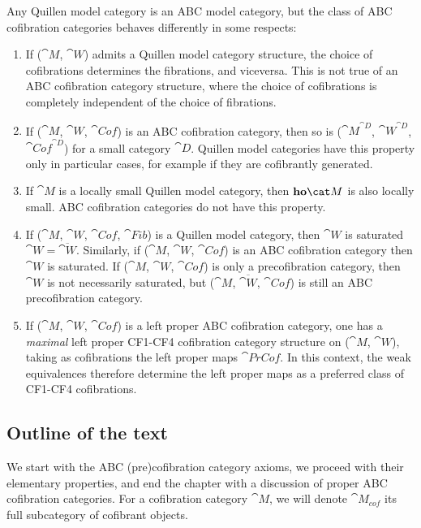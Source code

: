 Any Quillen model category is an ABC model category, but the class of ABC cofibration categories behaves differently in some respects:
\begin{enumerate}
\item
If (${\cat M}$, ${\cat W}$) admits a Quillen model category structure, the choice of cofibrations determines the fibrations, and viceversa. This is not true of an ABC cofibration category structure, where the choice of cofibrations is completely independent of the choice of fibrations.
\item
If (${\cat M}$, ${\cat W}$, ${\cat Cof}$) is an ABC cofibration category, then so is (${\cat M}^{\cat D}$, ${\cat W}^{\cat D}$, ${\cat Cof}^{\cat D}$) for a small category ${\cat D}$. Quillen model categories have this property only in particular cases, for example if they are cofibrantly generated.
\item
If ${\cat M}$ is a locally small Quillen model category, then ${\bf ho}{\cat M}$ is also locally small. ABC cofibration categories do not have this property.
\item
If (${\cat M}$, ${\cat W}$, ${\cat Cof}$, ${\cat Fib}$) is a Quillen model category, then ${\cat W}$ is saturated ${\cat W} = \overline{\cat W}$. Similarly, if (${\cat M}$, ${\cat W}$, ${\cat Cof}$) is an ABC cofibration category then ${\cat W}$ is saturated. If (${\cat M}$, ${\cat W}$, ${\cat Cof}$) is only a precofibration category, then ${\cat W}$ is not necessarily saturated, but (${\cat M}$, $\overline{\cat W}$, ${\cat Cof}$) is still an ABC precofibration category.
\item
If (${\cat M}$, ${\cat W}$, ${\cat Cof}$) is a left proper ABC cofibration category, one has a {\it maximal} left proper CF1-CF4 cofibration category structure on (${\cat M}$, ${\cat W}$), taking as cofibrations the left proper maps ${\cat PrCof}$. In this context, the weak equivalences therefore determine the left proper maps as a preferred class of CF1-CF4 cofibrations.
\end{enumerate}

\subsection*{Outline of the text}
\label{subsec:outline}

We start  with the ABC (pre)cofibration category axioms, we proceed with their elementary properties, and end the chapter with a discussion of proper ABC cofibration categories. For a cofibration category ${\cat M}$, we will denote ${\cat M}_{cof}$ its full subcategory of cofibrant objects.

